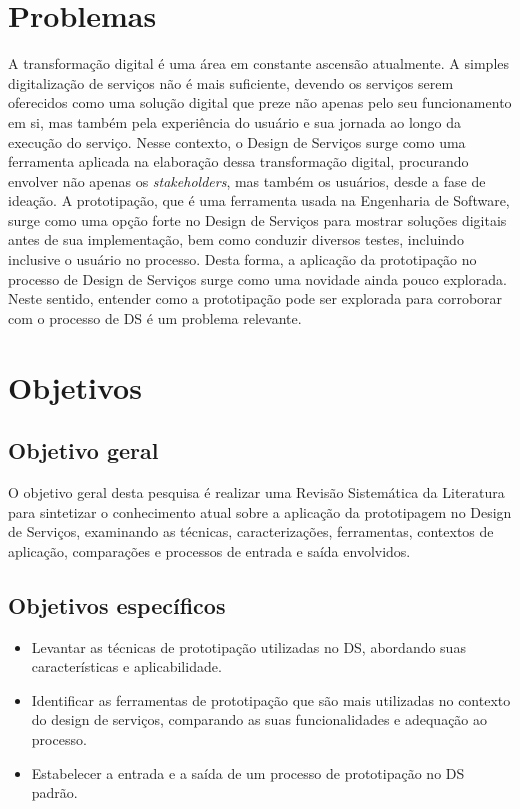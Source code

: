 \section {Problemas}

A transformação digital é uma área em constante ascensão atualmente. A simples digitalização de serviços não é mais suficiente, devendo os serviços serem oferecidos como uma solução digital que preze não apenas pelo seu funcionamento em si, mas também pela experiência do usuário e sua jornada ao longo da execução do serviço. Nesse contexto, o Design de Serviços surge como uma ferramenta aplicada na elaboração dessa transformação digital, procurando envolver não apenas os \textit{stakeholders}, mas também os usuários, desde a fase de ideação. A prototipação, que é uma ferramenta usada na Engenharia de Software, surge como uma opção forte no Design de Serviços para mostrar soluções digitais antes de sua implementação, bem como conduzir diversos testes, incluindo inclusive o usuário no processo. Desta forma, a aplicação da prototipação no processo de Design de Serviços surge como uma novidade ainda pouco explorada. Neste sentido, entender como a prototipação pode ser explorada para corroborar com o processo de DS é um problema relevante.

\section {Objetivos}
\subsection{Objetivo geral}

O objetivo geral desta pesquisa é realizar uma Revisão Sistemática da Literatura para sintetizar o conhecimento atual sobre a aplicação da prototipagem no Design de Serviços, examinando as técnicas, caracterizações, ferramentas, contextos de aplicação, comparações e processos de entrada e saída envolvidos. %

\subsection{Objetivos específicos}

\begin{itemize}
	\item Levantar as técnicas de prototipação utilizadas no DS, abordando suas características e aplicabilidade.
	
	\item Identificar as ferramentas de prototipação que são mais utilizadas no contexto do design de serviços, comparando as suas funcionalidades e adequação ao processo.
	
	\item Estabelecer a entrada e a saída de um processo de prototipação no DS padrão.%
\end{itemize}

